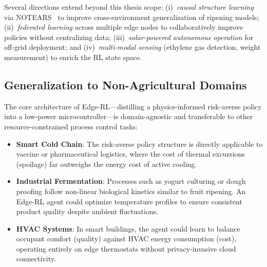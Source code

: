 \documentclass[conference]{IEEEtran}
\begin{document}
    Several directions extend beyond this thesis scope: (i)~\textit{causal structure learning} via NOTEARS~\cite{zheng2018notears} to improve cross-environment generalization of ripening models; (ii)~\textit{federated learning} across multiple edge nodes to collaboratively improve policies without centralizing data; (iii)~\textit{solar-powered autonomous operation} for off-grid deployment; and (iv)~\textit{multi-modal sensing} (ethylene gas detection, weight measurement) to enrich the RL state space.

    \subsection{Generalization to Non-Agricultural Domains}

    The core architecture of Edge-RL---distilling a physics-informed risk-averse policy into a low-power microcontroller---is domain-agnostic and transferable to other resource-constrained process control tasks:

    \begin{itemize}
        \item \textbf{Smart Cold Chain}: The risk-averse policy structure is directly applicable to vaccine or pharmaceutical logistics, where the cost of thermal excursions (spoilage) far outweighs the energy cost of active cooling.
        \item \textbf{Industrial Fermentation}: Processes such as yogurt culturing or dough proofing follow non-linear biological kinetics similar to fruit ripening. An Edge-RL agent could optimize temperature profiles to ensure consistent product quality despite ambient fluctuations.
        \item \textbf{HVAC Systems}: In smart buildings, the agent could learn to balance occupant comfort (quality) against HVAC energy consumption (cost), operating entirely on edge thermostats without privacy-invasive cloud connectivity.
    \end{itemize}
\end{document}
